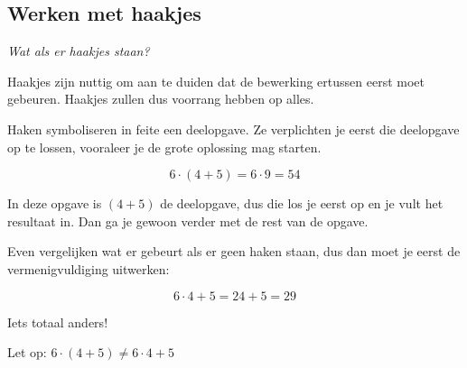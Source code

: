 \subsection{Werken met haakjes}
\emph{Wat als er haakjes staan?}

Haakjes zijn nuttig om aan te duiden dat de bewerking ertussen eerst moet gebeuren. Haakjes zullen dus voorrang hebben op alles.


Haken symboliseren in feite een deelopgave. Ze verplichten je eerst die deelopgave op te lossen, vooraleer je de grote oplossing mag starten.


\begin{voorbeeld}
\begin{equation*}
6 \cdot (4+5) = 6 \cdot 9 = 54
\end{equation*}	
	
In deze opgave is $(4 + 5)$ de deelopgave, dus die los je eerst op en je vult het resultaat in. 
Dan ga je gewoon verder met de rest van de opgave.

Even vergelijken wat er gebeurt als er geen haken staan, dus dan moet je eerst de vermenigvuldiging uitwerken:

\begin{equation*}
6 \cdot 4+5 = 24+5=29
\end{equation*}	

Iets totaal anders!

Let op: $6 \cdot (4+5) \ne 6\cdot 4+5$

\end{voorbeeld}

